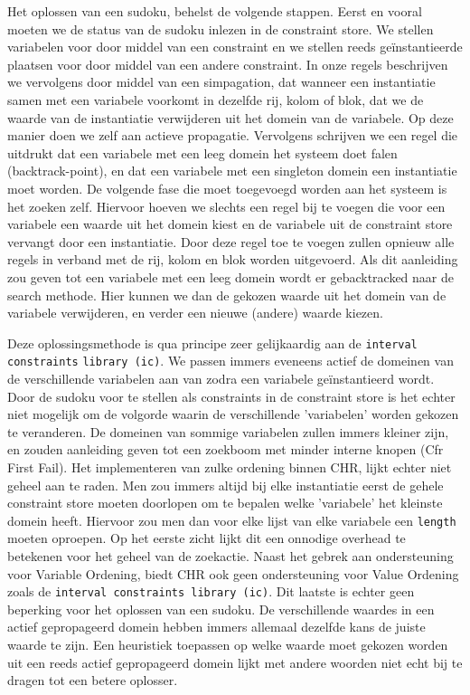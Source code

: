 Het oplossen van een sudoku, behelst de volgende stappen. Eerst en vooral moeten we de status van de sudoku inlezen in de
constraint store. We stellen variabelen voor door middel van een constraint en we stellen reeds ge\"instantieerde plaatsen
voor door middel van een andere constraint. In onze regels beschrijven we vervolgens door middel van een simpagation, 
dat wanneer een instantiatie samen met een variabele voorkomt in dezelfde rij, kolom of blok, dat we de waarde van de instantiatie
verwijderen uit het domein van de variabele. Op deze manier doen we zelf aan actieve propagatie. Vervolgens schrijven we
een regel die uitdrukt dat een variabele met een leeg domein het systeem doet falen (backtrack-point), en dat een
variabele met een singleton domein een instantiatie moet worden. De volgende fase die moet toegevoegd worden aan het systeem
is het zoeken zelf. Hiervoor hoeven we slechts een regel bij te voegen die voor een variabele een waarde uit het domein kiest
en de variabele uit de constraint store vervangt door een instantiatie. Door deze regel toe te voegen zullen opnieuw alle
regels in verband met de rij, kolom en blok worden uitgevoerd. Als dit aanleiding zou geven tot een variabele met een leeg
domein wordt er gebacktracked naar de search methode. Hier kunnen we dan de gekozen waarde uit het domein van de variabele verwijderen,
en verder een nieuwe (andere) waarde kiezen.

Deze oplossingsmethode is qua principe zeer gelijkaardig aan de \verb|interval constraints| \verb|library (ic)|.
We passen immers eveneens actief de domeinen van de verschillende variabelen aan van zodra een variabele
ge\"instantieerd wordt. Door de sudoku voor te stellen als constraints in de constraint store is het echter niet mogelijk om de volgorde waarin de verschillende
'variabelen' worden gekozen te veranderen. De domeinen van sommige variabelen zullen immers kleiner zijn, en zouden aanleiding
geven tot een zoekboom met minder interne knopen (Cfr First Fail). Het implementeren van zulke ordening binnen CHR, lijkt
echter niet geheel aan te raden. Men zou immers altijd bij elke instantiatie eerst de gehele constraint store moeten doorlopen 
om te bepalen welke 'variabele' het kleinste domein heeft. Hiervoor zou men dan voor elke lijst van elke variabele een \verb|length| moeten
oproepen. Op het eerste zicht lijkt dit een onnodige overhead te betekenen voor het geheel van de zoekactie.
Naast het gebrek aan ondersteuning voor Variable Ordening, biedt CHR ook geen ondersteuning voor Value Ordening zoals de \verb|interval constraints library (ic)|.
Dit laatste is echter geen beperking voor het oplossen van een sudoku. De verschillende waardes in een actief gepropageerd domein
hebben immers allemaal dezelfde kans de juiste waarde te zijn. Een heuristiek toepassen op welke waarde moet gekozen
worden uit een reeds actief gepropageerd domein lijkt met andere woorden niet echt bij te dragen tot een betere oplosser.

